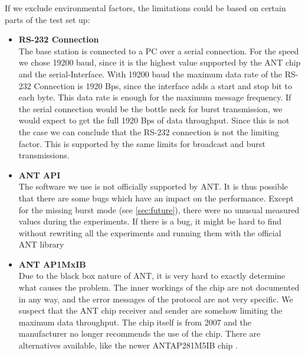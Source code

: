 If we exclude environmental factors, the limitations could be based on certain parts of the test set up:
\begin{itemize}
	\item{\textbf{RS-232 Connection}} \hfill \\ The base station is connected to a PC over a serial connection. For the speed we chose 19200 baud, since it is the highest value supported by the ANT chip and the serial-Interface. With 19200 baud the maximum data rate of the RS-232 Connection is 1920 Bps, since the interface adds a start and stop bit to each byte. This data rate is enough for the maximum message frequency. If the serial connection would be the bottle neck for burst transmission, we would expect to get the full 1920 Bps of data throughput. Since this is not the case we can conclude that the RS-232 connection is not the limiting factor. This is supported by the same limits for broadcast and burst transmissions.

	\item{\textbf{ANT API}} \hfill \\ The software we use is not officially supported by ANT. It is thus possible that there are some bugs which have an impact on the performance. Except for the missing burst mode (see \ref{sec:future}), there were no unusual measured values during the experiments. If there is a bug, it might be hard to find without rewriting all the experiments and running them with the official ANT library \cite{ANTWinLib}
	
	\item{\textbf{ANT AP1MxIB}} \hfill \\ Due to the black box nature of ANT, it is very hard to exactly determine what causes the problem. The inner workings of the chip are not documented in any way, and the error messages of the protocol are not very specific. We suspect that the ANT chip receiver and sender are somehow limiting the maximum data throughput. The chip itself is from 2007 and the manufacturer no longer recommends the use of the chip\cite{AP1page}. There are alternatives available, like the newer ANTAP281M5IB chip \cite{AP2Datasheet}.
\end{itemize}
\newpage